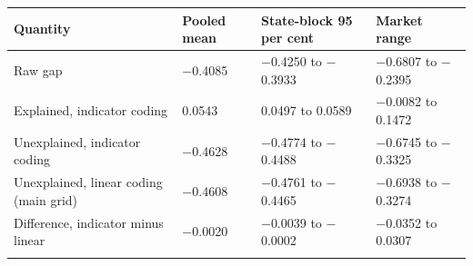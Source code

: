 \setlength{\tabcolsep}{4pt}
\begin{tabular}{@{}llll@{}}
\toprule
Quantity & Pooled mean & State-block 95 per cent & Market range\\
\midrule
Raw gap & $-$0.4085 & $-$0.4250 to $-$0.3933 & $-$0.6807 to $-$0.2395\\
Explained, indicator coding & 0.0543 & 0.0497 to 0.0589 & $-$0.0082 to 0.1472\\
Unexplained, indicator coding & $-$0.4628 & $-$0.4774 to $-$0.4488 & $-$0.6745 to $-$0.3325\\
Unexplained, linear coding (main grid) & $-$0.4608 & $-$0.4761 to $-$0.4465 & $-$0.6938 to $-$0.3274\\
Difference, indicator minus linear & $-$0.0020 & $-$0.0039 to $-$0.0002 & $-$0.0352 to 0.0307\\
\botrule
\end{tabular}
